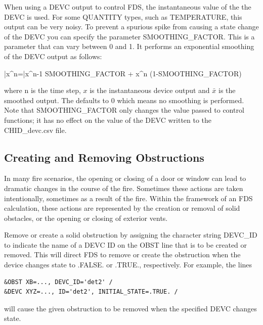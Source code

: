 \documentclass[11pt]{book}
\begin{document}
When using a {\ct DEVC} output to control FDS, the instantaneous value of the the {\ct DEVC} is used.  For some {\ct QUANTITY} types, such as {\ct TEMPERATURE}, this output can be very noisy.  To prevent a spurious spike from causing a state change of the {\ct DEVC} you can specify the parameter {\ct SMOOTHING\_FACTOR}.  This is a parameter that can vary between 0 and 1.  It performs an exponential smoothing of the {\ct DEVC} output as follows:

\be
\bar{x}^n=\bar{x}^{n-1} \; \mbox{\ct SMOOTHING\_FACTOR} + x^n \; (1-\mbox{\ct SMOOTHING\_FACTOR})
\ee

\noindent
where n is the time step, $x$ is the instantaneous device output and $\bar{x}$ is the smoothed output.  The  defaults to 0 which means no smoothing is performed.  Note that {\ct SMOOTHING\_FACTOR} only changes the value passed to control functions; it has no effect on the value of the {\ct DEVC} written to the {\ct CHID\_devc.csv} file.

\subsection{Creating and Removing Obstructions}
\label{info:create_remove}

In many fire scenarios, the opening or closing of a door or window can lead to dramatic changes in the course of the fire. Sometimes these actions are taken intentionally, sometimes as a result of the fire. Within the framework of an FDS calculation, these actions are represented by the creation or removal of solid obstacles, or the opening or closing of exterior vents.

Remove or create a solid obstruction by assigning the character string {\ct DEVC\_ID} to indicate the name of a {\ct DEVC} {\ct ID} on the {\ct OBST} line that is to be created or removed.  This will direct FDS to remove or create the obstruction when the device changes state to {\ct .FALSE.} or {\ct .TRUE.}, respectively. For example, the lines
\begin{lstlisting}
&OBST XB=..., DEVC_ID='det2' /
&DEVC XYZ=..., ID='det2', INITIAL_STATE=.TRUE. /
\end{lstlisting}
will cause the given obstruction to be removed when the specified {\ct DEVC} changes state.
\end{document}
